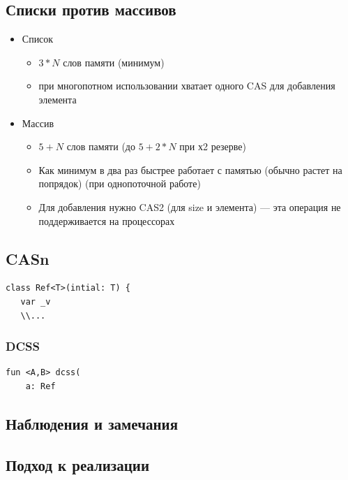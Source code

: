 \documentclass[10pt,a4paper,oneside,titlepage]{article}
\theoremstyle{plain}
\theoremstyle{defenition}
\begin{document}
\subsection{Списки против массивов}
\begin{itemize}
	\item Список
	\begin{itemize}
		\item $3*N$ слов памяти (минимум)
		\item при многопотном использовании хватает одного CAS для добавления элемента
	\end{itemize}
    \item Массив
    \begin{itemize}
    	\item $5+N$ слов памяти (до $5+2*N$ при х2 резерве)
    	\item Как минимум в два раз быстрее работает с памятью (обычно растет на попрядок) (при однопоточной работе)
    	\item Для добавления нужно CAS2 (для size и элемента) --- эта операция не поддерживается на процессорах
    \end{itemize}
\end{itemize}

\subsection{CASn}

\begin{lstlisting}
class Ref<T>(intial: T) {
   var _v
   \\...
\end{lstlisting}

\subsubsection{DCSS}

\begin{lstlisting}
fun <A,B> dcss(
    a: Ref
\end{lstlisting}

\subsection{Наблюдения и замечания}

\subsection{Подход к реализации}
\end{document}
